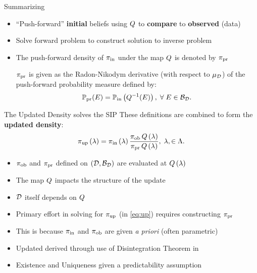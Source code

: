 \begin{frame}[t]{Summarizing}
\begin{itemize}
	\item ``Push-forward'' \textbf{initial} beliefs using $Q$ to \textbf{compare} to \textbf{observed} (data)
	\item Solve forward problem to construct solution to inverse problem
	\item The push-forward density of $\operatorname*{\pi_{in}}$ under the map $Q$ is denoted by $\operatorname*{\pi_{pr}}$

	\begin{defn}\label{defn:predicted}
		$\operatorname*{\pi_{pr}}$ is given as the Radon-Nikodym derivative (with respect to $\mu_{\mathcal{D}}$) of the push-forward probability measure defined by:
		\begin{equation}\label{eq:pred}
			\operatorname*{\mathbb{P}_{pr}} (E)  = \operatorname*{\mathbb{P}_{in}} \left ( Q^{-1}(E) \right ), \; \forall \; E \in \mathcal{B}_{\mathcal{D}}.
		\end{equation}
	\end{defn}

\end{itemize}

\end{frame}

\begin{frame}[t]{The Updated Density solves the SIP}
These definitions are combined to form the \textbf{updated density}:
\begin{equation}\label{eq:up}
\operatorname*{\pi_{up}} \left ( \lambda \right ) = \operatorname*{\pi_{in}} \left ( \lambda \right ) \frac{\operatorname*{\pi_{ob}} Q\left ( \lambda \right ) }{\operatorname*{\pi_{pr}} Q\left ( \lambda \right ) }, \; \lambda, \in {\Lambda}.
\end{equation}

\begin{itemize}
	\item $\operatorname*{\pi_{ob}}$ and $\operatorname*{\pi_{pr}}$ defined on $(\mathcal{D}, \mathcal{B}_{\mathcal{D}})$ are evaluated at $Q\left ( \lambda \right )$
	\item The map $Q$ impacts the structure of the update
	\item $\mathcal{D}$ itself depends on $Q$
	\item Primary effort in solving for $\operatorname*{\pi_{up}}$ (in \eqref{eq:up}) requires constructing $\operatorname*{\pi_{pr}}$
	\item This is because $\operatorname*{\pi_{in}}$ and $\operatorname*{\pi_{ob}}$ are given \emph{a priori} (often parametric)
	\item Updated derived through use of Disintegration Theorem in \cite{BJW18}
	\item Existence and Uniqueness given a predictability assumption
\end{itemize}
\end{frame}



